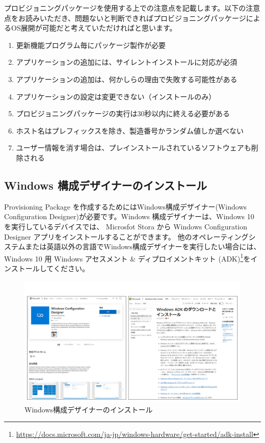 プロビジョニングパッケージを使用する上での注意点を記載します。以下の注意点をお読みいただき、問題ないと判断できればプロビジョニングパッケージによるOS展開が可能だと考えていただければと思います。

\begin{enumerate}
    \renewcommand{\labelenumi}{\alph{enumi})}
    \item 更新機能プログラム毎にパッケージ製作が必要
    \item アプリケーションの追加には、サイレントインストールに対応が必須
    \item アプリケーションの追加は、何かしらの理由で失敗する可能性がある
    \item アプリケーションの設定は変更できない（インストールのみ）
    \item プロビジョニングパッケージの実行は30秒以内に終える必要がある
    \item ホスト名はプレフィックスを除き、製造番号かランダム値しか選べない
    \item ユーザー情報を消す場合は、プレインストールされているソフトウェアも削除される
\end{enumerate}

\subsection{Windows 構成デザイナーのインストール}
\label{sec:Windows構成デザイナーのインストール}

Provisioning Package を作成するためにはWindows構成デザイナー(Windows Configuration Designer)が必要です。Windows 構成デザイナーは、Windows 10 を実行しているデバイスでは、 Microsfot Stora から Windows Configuration Designer アプリをインストールすることができます。
他のオペレーティングシステムまたは英語以外の言語でWindows構成デザイナーを実行したい場合には、Windows 10 用 Windows アセスメント \& ディプロイメントキット (ADK)\footnote{\url{https://docs.microsoft.com/ja-jp/windows-hardware/get-started/adk-install}}をインストールしてください。

\begin{figure}[htbp]
    \centering
    \includegraphics[width=17cm]{figures/WindowsConfigurationDesigner.png}
    \caption{Windows構成デザイナーのインストール}
    \label{fig:WindowsConfigutionDesigner}
    \vspace{6cm}
\end{figure}

